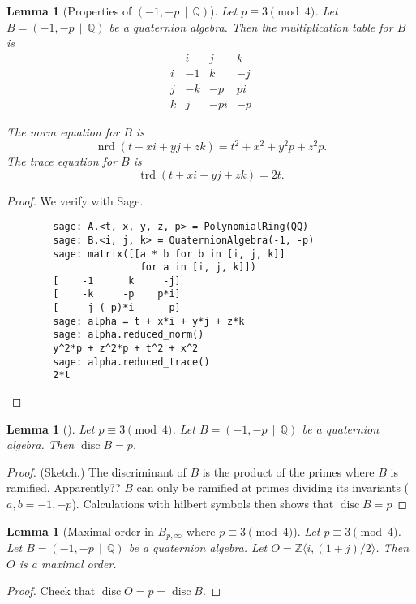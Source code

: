 \documentclass[10pt]{article}
\theoremstyle{plain}
\newtheorem{lemma}[theorem]{Lemma}
\theoremstyle{definition}
\newcommand{\op}{\operatorname}
\newcommand{\Z}{\mathbb{Z}}
\newcommand{\Q}{\mathbb{Q}}
\newcommand{\nrd}{\op{nrd}}
\newcommand{\trd}{\op{trd}}
\newcommand{\disc}{\op{disc}}
\begin{document}
\begin{lemma}[Properties of \( (-1, -p \, \mid \, \Q) \)]
    Let \( p \equiv 3 \pmod{4} \).
    Let \( B =  (-1, -p \, \mid \, \Q) \) be a quaternion algebra.
    Then the multiplication table for \( B \) is
    \[
        \begin{array}{c|ccc}
              & i  & j   & k  \\
            \hline
            i & -1 & k   & -j \\
            j & -k & -p  & pi \\
            k & j  & -pi & -p
        \end{array}
    \]

    The norm equation for \( B \) is
    \[
        \nrd(t + xi + yj + zk) = t^2 + x^2 + y^2p + z^2p.
    \]
    The trace equation for \( B \) is
    \[
        \trd(t + xi + yj + zk) = 2t.
    \]
\end{lemma}
\begin{proof}
    We verify with Sage.
    \begin{lstlisting}
        sage: A.<t, x, y, z, p> = PolynomialRing(QQ)
        sage: B.<i, j, k> = QuaternionAlgebra(-1, -p)
        sage: matrix([[a * b for b in [i, j, k]]
                       for a in [i, j, k]])
        [    -1      k     -j]
        [    -k     -p    p*i]
        [     j (-p)*i     -p]
        sage: alpha = t + x*i + y*j + z*k
        sage: alpha.reduced_norm()
        y^2*p + z^2*p + t^2 + x^2
        sage: alpha.reduced_trace()
        2*t
    \end{lstlisting}
\end{proof}

\begin{lemma}[]
    Let \( p \equiv 3 \pmod{4} \).
    Let \( B =  (-1, -p \, \mid \, \Q) \) be a quaternion algebra.
    Then \( \disc B = p \).
\end{lemma}
\begin{proof}
    (Sketch.)
    The discriminant of \( B \) is the product of the primes where \( B \) is ramified.
    Apparently?? \( B \) can only be ramified at primes dividing its invariants (\( a, b = -1, -p\)).
    Calculations with hilbert symbols then shows that \( \disc B = p \)
\end{proof}

\begin{lemma}[Maximal order in \( B_{p, \infty} \) where \( p \equiv 3 \pmod{4} \)]
    Let \( p \equiv 3 \pmod{4} \).
    Let \( B =  (-1, -p \, \mid \, \Q) \) be a quaternion algebra.
    Let \( O = \Z \langle i, (1+j) / 2 \rangle \).
    Then \( O \) is a maximal order.
\end{lemma}
\begin{proof}
    Check that \( \disc O  = p = \disc B\).
\end{proof}
\end{document}
